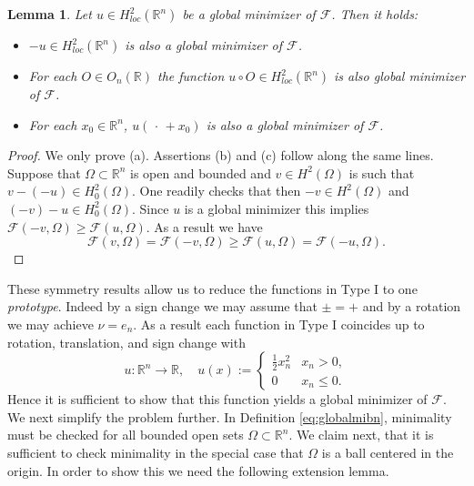 \documentclass[twoside,11pt]{article}
\newtheorem{lemma}{Lemma}
\theoremstyle{definition}
\begin{document}
\begin{lemma}\label{lem:invariance}
    Let $u \in H^2_{loc}(\mathbb{R}^n)$ be a global minimizer of $\mathcal{F}$. Then it holds:
    \begin{itemize}
        \item[(a)] $-u \in H^2_{loc}(\mathbb{R}^n)$ is also a global minimizer of $\mathcal{F}$.
        \item[(b)] For each $O \in O_n(\mathbb{R})$ the function $u \circ O \in H^2_{loc}(\mathbb{R}^n)$ is also global minimizer of $\mathcal{F}$.
        \item[(c)] For each $x_0 \in \mathbb{R}^n$, $u(\, \cdot\, + x_0)$ is also a global minimizer of $\mathcal{F}$.
    \end{itemize}%
\end{lemma}
\begin{proof}
    We only prove (a). Assertions  (b) and (c) follow along the same lines. Suppose that $\Omega \subset \mathbb{R}^n$ 
    is open and bounded and $v \in H^2(\Omega)$ is such that $v- (-u) \in H_0^2(\Omega)$. One readily checks that then $-v \in H^2(\Omega)$ and $(-v)-u \in H_0^2(\Omega)$. Since $u$ is a global minimizer this implies $\mathcal{F}(-v, \Omega)\geq \mathcal{F}(u,\Omega)$. As a result we have
   \begin{equation*}
     \mathcal{F}(v,\Omega)=   \mathcal{F}(-v, \Omega) \geq \mathcal{F}(u,\Omega) = \mathcal{F}(-u,\Omega). 
   \end{equation*}
\end{proof}
These symmetry results allow us to reduce the functions in Type I to one \emph{prototype}. Indeed by a sign change we may assume that $\pm = +$ and by a rotation we may achieve $\nu = e_n$. As a result each function in Type I coincides up to rotation, translation,
and sign change with 
\begin{equation}\label{eq:2}
    u : \mathbb{R}^n \rightarrow \mathbb{R}, \quad u(x):= \begin{cases}
        \frac{1}{2}x_n^2 & x_n > 0,\\ 0 & x_n \leq 0.
    \end{cases}
\end{equation}
Hence  it is sufficient to show that this function yields a global minimizer of $\mathcal{F}.$ We next simplify the problem further. In Definition \ref{eq:globalmibn}, minimality must be checked for all bounded open sets $\Omega \subset \mathbb{R}^n$. We claim next, that it is sufficient to check minimality in the special case that $\Omega$ is a ball centered in the origin. In order to show this we need the following extension lemma. 
\end{document}
